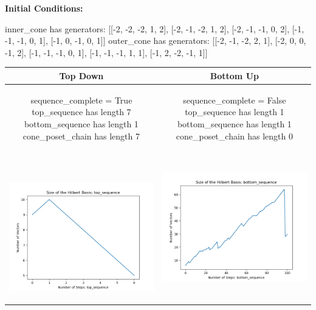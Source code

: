 \documentclass[10pt]{article}
\begin{document}
\textbf{Initial Conditions:}
\begin{SAGE}
inner_cone has generators: 
[[-2, -2, -2, 1, 2], [-2, -1, -2, 1, 2], [-2, -1, -1, 0, 2], [-1, -1, -1, 0, 1], [-1, 0, -1, 0, 1]]
outer_cone has generators: 
[[-2, -1, -2, 2, 1], [-2, 0, 0, -1, 2], [-1, -1, -1, 0, 1], [-1, -1, -1, 1, 1], [-1, 2, -2, -1, 1]]

\end{SAGE}
\begin{tabular}{c|c}
\textbf{Top Down} & \textbf{Bottom Up} \\ \hline  
\begin{SAGE}
	sequence_complete = True
	top_sequence has length 7
	bottom_sequence has length 1
	cone_poset_chain has length 7
\end{SAGE} 
&
\begin{SAGE}
	sequence_complete = False
	top_sequence has length 1
	bottom_sequence has length 1
	cone_poset_chain has length 0
\end{SAGE} 
\\ \hline
\
\begin{minipage}{.45\textwidth}
\includegraphics[width=\textwidth]{"DATA/5d/5 generators 2 bound B/top_sequence SIZE"}
\end{minipage} &
\begin{minipage}{.45\textwidth}
\includegraphics[width=\textwidth]{"DATA/5d/5 generators 2 bound B bottomup/bottom_sequence SIZE"}

\end{minipage}
\end{tabular}
\end{document}
